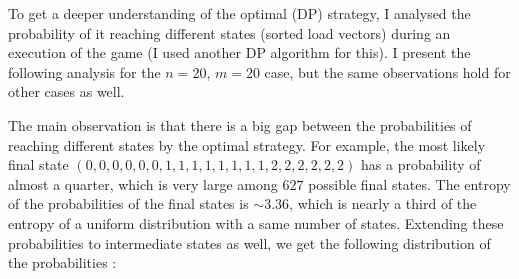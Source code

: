 To get a deeper understanding of the optimal (DP) strategy, I analysed the probability of it reaching different states (sorted load vectors) during an execution of the game (I used another DP algorithm for this). I present the following analysis for the $n=20$, $m=20$ case, but the same observations hold for other cases as well.

The main observation is that there is a big gap between the probabilities of reaching different states by the optimal strategy. For example, the most likely final state $(0, 0, 0, 0, 0, 0, 1, 1, 1, 1, 1, 1, 1, 1, 2, 2, 2, 2, 2, 2)$ has a probability of almost a quarter, which is very large among $627$ possible final states. The entropy of the probabilities of the final states is $\sim 3.36$, which is nearly a third of the entropy of a uniform distribution with a same number of states. Extending these probabilities to intermediate states as well, we get the following distribution of the probabilities :




